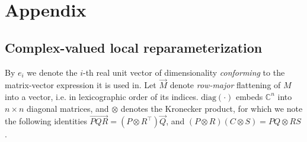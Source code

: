 \documentclass[a4paper,10pt]{article}
\newcommand{\cplx}{\mathbb{C}}
\renewcommand{\vec}[1]{\overrightarrow{#1}}
\newcommand{\diag}[1]{\mathrm{diag}{#1}}
\begin{document}

\clearpage




\clearpage

\section{Appendix} %
\label{sec:appendix}

\subsection{Complex-valued local reparameterization} %
\label{sub:complex_valued_local_reparameterization}

By $e_i$ we denote the $i$-th real unit vector of dimensionality \textit{conforming} to the
matrix-vector expression it is used in. Let $\vec{M}$ denote \textit{row-major} flattening
of $M$ into a vector, i.e. in lexicographic order of its indices. $\diag{(\cdot)}$ embeds
$\cplx^n$ into $n\times n$ diagonal matrices, and $\otimes$ denotes the Kronecker product,
for which we note the following identities $
  \vec{P Q R} = (P \otimes R^\top) \vec{Q}
$, and $
  (P \otimes R) (C \otimes S) = P Q \otimes R S
$ \citep{petersen_matrix_2012}.
\end{document}

